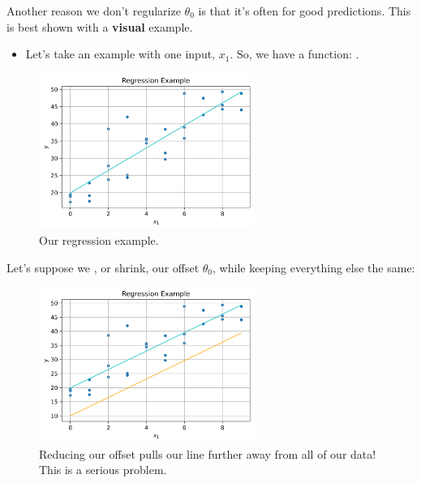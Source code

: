         \phantom{}

        Another reason we don't regularize $\theta_0$ is that it's often  for good predictions. This is best shown with a \textbf{visual} example.

        \begin{itemize}
            \item Let's take an example with one input, $x_1$. So, we have a  function: .
        \end{itemize}
        
        \begin{figure}[H]
        \centering
            \includegraphics[width=70mm,scale=0.5]{images/regression_images/Regression_Keep_Offset.png}
        
            \caption*{Our regression example.}
        \end{figure}
        
        Let's suppose we , or shrink, our offset $\theta_0$, while keeping everything else the same:
        
        \begin{figure}[H]
        \centering
            \includegraphics[width=70mm,scale=0.5]{images/regression_images/Regression_Remove_Offset.png}
        
            \caption*{Reducing our offset pulls our line further away from all of our data! This is a serious problem.}
        \end{figure}
        
